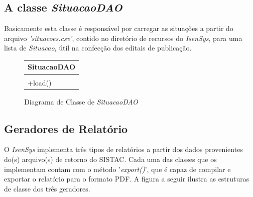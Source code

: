 \documentclass[
	12pt,			%
	openright,		%
	oneside,	
	a4paper,		%
	english,		%
	brazil			%
]{abntex2/abntex2}  %
\begin{document}
			\subsection{A classe \textit{SituacaoDAO}}
	
				Basicamente esta classe é responsável por carregar as situações a partir do arquivo \textit{'situacoes.csv'}, contido no diretório de recursos do \textit{IsenSys}, para uma lista de \textit{Situacao}, útil na confecção dos editais de publicação.
	
				\begin{figure}[h]
					\begin{center}
						
						\caption{Diagrama de Classe de \textit{SituacaoDAO}}
						\label{situacaodao-uml}
						
						\begin{tabular}{|l|}
							\hline
							\multicolumn{1}{|c|}{\textbf{SituacaoDAO}} \\ \hline
							                                           \\ \hline
							+load()                                    \\ \hline
						\end{tabular}
						
					\end{center}
				\end{figure}
	
			\subsection{Geradores de Relatório}
	
				O \textit{IsenSys} implementa três tipos de relatórios a partir dos dados provenientes do(s) arquivo(s) de retorno do SISTAC. Cada uma das classes que os implementam contam com o método '\textit{export()}', que é capaz de compilar e exportar o relatório para o formato PDF. A figura a seguir ilustra as estruturas de classe dos três geradores.
	
\end{document}
